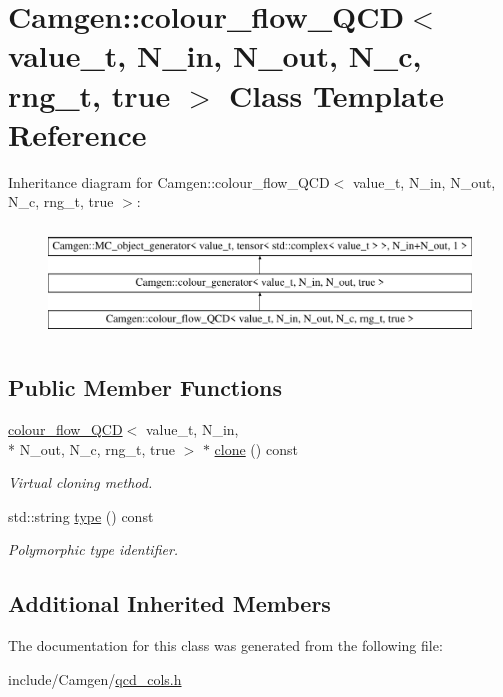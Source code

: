 \hypertarget{a00081}{\section{Camgen\-:\-:colour\-\_\-flow\-\_\-\-Q\-C\-D$<$ value\-\_\-t, N\-\_\-in, N\-\_\-out, N\-\_\-c, rng\-\_\-t, true $>$ Class Template Reference}
\label{a00081}
}
Inheritance diagram for Camgen\-:\-:colour\-\_\-flow\-\_\-\-Q\-C\-D$<$ value\-\_\-t, N\-\_\-in, N\-\_\-out, N\-\_\-c, rng\-\_\-t, true $>$\-:\begin{figure}[H]
\begin{center}
\leavevmode
\includegraphics[height=3.000000cm]{a00081}
\end{center}
\end{figure}
\subsection*{Public Member Functions}
\begin{DoxyCompactItemize}
\item 
\hypertarget{a00081_a755b30fff75032ca9e7bbb17df093860}{\hyperlink{a00079}{colour\-\_\-flow\-\_\-\-Q\-C\-D}$<$ value\-\_\-t, N\-\_\-in, \\*
N\-\_\-out, N\-\_\-c, rng\-\_\-t, true $>$ $\ast$ \hyperlink{a00081_a755b30fff75032ca9e7bbb17df093860}{clone} () const }\label{a00081_a755b30fff75032ca9e7bbb17df093860}

\begin{DoxyCompactList}\small\item\em Virtual cloning method. \end{DoxyCompactList}\item 
\hypertarget{a00081_afc00054d20838997be06a21feb415ae6}{std\-::string \hyperlink{a00081_afc00054d20838997be06a21feb415ae6}{type} () const }\label{a00081_afc00054d20838997be06a21feb415ae6}

\begin{DoxyCompactList}\small\item\em Polymorphic type identifier. \end{DoxyCompactList}\end{DoxyCompactItemize}
\subsection*{Additional Inherited Members}


The documentation for this class was generated from the following file\-:\begin{DoxyCompactItemize}
\item 
include/\-Camgen/\hyperlink{a00724}{qcd\-\_\-cols.\-h}\end{DoxyCompactItemize}
